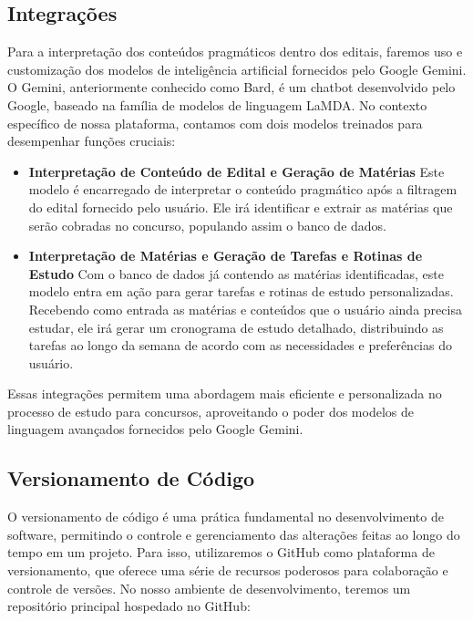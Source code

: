 \subsection{Integrações}
Para a interpretação dos conteúdos pragmáticos dentro dos editais, faremos uso e customização dos modelos de inteligência artificial fornecidos pelo Google Gemini. O Gemini, anteriormente conhecido como Bard, é um chatbot desenvolvido pelo Google, baseado na família de modelos de linguagem LaMDA.
No contexto específico de nossa plataforma, contamos com dois modelos treinados para desempenhar funções cruciais:

\begin{itemize}
\item \textbf{Interpretação de Conteúdo de Edital e Geração de Matérias} \newline
Este modelo é encarregado de interpretar o conteúdo pragmático após a filtragem do edital fornecido pelo usuário. Ele irá identificar e extrair as matérias que serão cobradas no concurso, populando assim o banco de dados.

\item \textbf{Interpretação de Matérias e Geração de Tarefas e Rotinas de Estudo} \newline
 Com o banco de dados já contendo as matérias identificadas, este modelo entra em ação para gerar tarefas e rotinas de estudo personalizadas. Recebendo como entrada as matérias e conteúdos que o usuário ainda precisa estudar, ele irá gerar um cronograma de estudo detalhado, distribuindo as tarefas ao longo da semana de acordo com as necessidades e preferências do usuário.
\end{itemize}

Essas integrações permitem uma abordagem mais eficiente e personalizada no processo de estudo para concursos, aproveitando o poder dos modelos de linguagem avançados fornecidos pelo Google Gemini.

\subsection{Versionamento de Código}
O versionamento de código é uma prática fundamental no desenvolvimento de software, permitindo o controle e gerenciamento das alterações feitas ao longo do tempo em um projeto. Para isso, utilizaremos o GitHub como plataforma de versionamento, que oferece uma série de recursos poderosos para colaboração e controle de versões. No nosso ambiente de desenvolvimento, teremos um repositório principal hospedado no GitHub:

